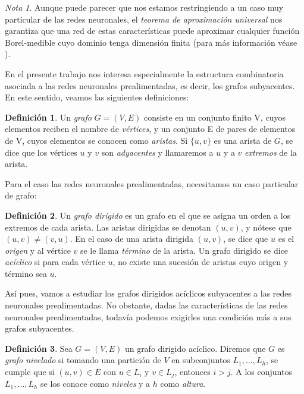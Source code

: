 \documentclass[12pt, a4paper, twoside]{book}
\numberwithin{equation}{section}
\theoremstyle{definition}
\newtheorem{defi}{Definición}[section]
\theoremstyle{remark}
\newtheorem*{remark}{Nota}
\theoremstyle{plain}
\begin{document}
	\begin{remark}
	Aunque puede parecer que nos 
	estamos restringiendo a un caso muy particular de las redes 
	neuronales, el \emph{teorema de aproximación universal} nos garantiza
	que una red de estas características puede aproximar cualquier función
	Borel-medible cuyo dominio tenga dimensión finita (para más 
	información véase \cite{TeoremaAproxUn-Kurt}).
	\end{remark}

	En el presente trabajo nos interesa especialmente la estructura 
	combinatoria asociada a las redes neuronales prealimentadas, es decir, 
	los grafos subyacentes. En este sentido, veamos las siguientes 
	definiciones:

	\begin{defi}
		Un \textit{grafo} $G=(V,E)$ consiste en un conjunto finito V, 
		cuyos 
		elementos reciben el nombre de \textit{vértices}, y un 
		conjunto 
		E de pares de elementos de V, cuyos elementos se conocen como 
		\textit{aristas}. Si $\{u,v\}$ es una arista de $G$, se dice 
		que los vértices $u$ y $v$ son \textit{adyacentes} y 
		llamaremos a $u$ y a $v$ \textit{extremos} de la arista.
	\end{defi}

	Para el caso las redes neuronales prealimentadas, necesitamos un caso 
	particular de grafo:
	
	\begin{defi}
		Un \textit{grafo dirigido} es un grafo en el que se asigna un 
		orden a los extremos de cada arista. Las aristas dirigidas se
		denotan $(u,v)$, y nótese que $(u,v)\neq(v,u)$. En el 
		caso de una arista dirigida $(u,v)$, se dice que $u$ es el 
		\textit{origen} y al vértice $v$ se le llama \textit{término} 
		de la arista. Un grafo dirigido se dice \textit{acíclico} si 
		para cada vértice $u$, no existe una sucesión de aristas cuyo
		origen y término sea $u$.
	\end{defi}

	Así pues, vamos a estudiar los grafos dirigidos acíclicos 
	subyacentes a las redes neuronales prealimentadas. No obstante, dadas 
	las características de las redes neuronales prealimentadas, todavía 
	podemos exigirles una condición más a sus grafos subyacentes.

	\begin{defi}
		Sea $G=(V, E)$ un grafo dirigido acíclico. Diremos que $G$ es 
		\textit{grafo nivelado} si tomando una partición de $V$ en 
		subconjuntos $L_{1},\dots,L_{h}$, se cumple que si $(u,v) \in 
		E$ con $u \in L_{i}$ y $v \in L_{j}$, entonces $i>j$. A los 
		conjuntos $L_{1},\dots,L_{h}$ se los conoce como 
		\textit{niveles} y a $h$ como \textit{altura}.
	\end{defi}	
\end{document}
